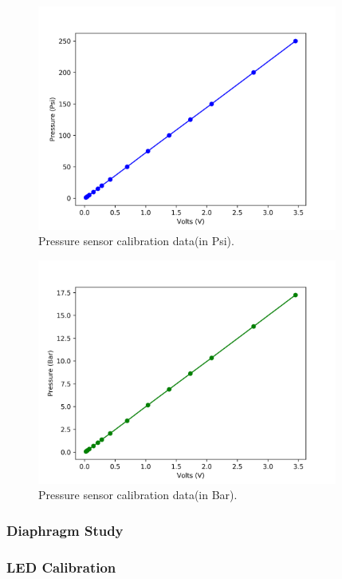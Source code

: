 \begin{figure}[H] 
	\centering
	\includegraphics[width=0.88\textwidth]{pressure1.png} 
	\caption{Pressure sensor calibration data(in Psi).}
	\label{fig:hydro_test}
\end{figure}

\begin{figure}[H] 
	\centering
	\includegraphics[width=0.88\textwidth]{pressure2.png} 
	\caption{Pressure sensor calibration data(in Bar).}
	\label{fig:hydro_test}
\end{figure}


\subsubsection{Diaphragm Study}
\subsubsection{LED Calibration}

